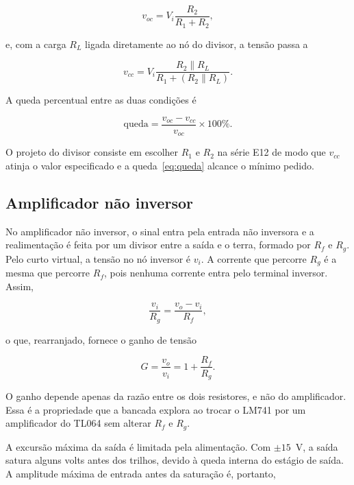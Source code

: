 \documentclass[11pt,a4paper]{article}
\begin{document}
\begin{equation}
v_{oc} = V_i \frac{R_2}{R_1 + R_2} ,
\label{eq:divisor_vazio}
\end{equation}

e, com a carga $R_L$ ligada diretamente ao nó do divisor, a tensão passa a

\begin{equation}
v_{cc} = V_i \frac{R_2 \parallel R_L}{R_1 + (R_2 \parallel R_L)} .
\label{eq:divisor_carga}
\end{equation}

A queda percentual entre as duas condições é

\begin{equation}
\text{queda} = \frac{v_{oc} - v_{cc}}{v_{oc}} \times 100\% .
\label{eq:queda}
\end{equation}

O projeto do divisor consiste em escolher $R_1$ e $R_2$ na série E12 de modo que $v_{cc}$ atinja o valor especificado e a queda~\eqref{eq:queda} alcance o mínimo pedido.

\subsection{Amplificador não inversor}

No amplificador não inversor, o sinal entra pela entrada não inversora e a realimentação é feita por um divisor entre a saída e o terra, formado por $R_f$ e $R_g$. Pelo curto virtual, a tensão no nó inversor é $v_i$. A corrente que percorre $R_g$ é a mesma que percorre $R_f$, pois nenhuma corrente entra pelo terminal inversor. Assim,

\begin{equation}
\frac{v_i}{R_g} = \frac{v_o - v_i}{R_f} ,
\label{eq:nao_inv_corrente}
\end{equation}

o que, rearranjado, fornece o ganho de tensão

\begin{equation}
G = \frac{v_o}{v_i} = 1 + \frac{R_f}{R_g} .
\label{eq:nao_inv_ganho}
\end{equation}

O ganho depende apenas da razão entre os dois resistores, e não do amplificador. Essa é a propriedade que a bancada explora ao trocar o LM741 por um amplificador do TL064 sem alterar $R_f$ e $R_g$.

A excursão máxima da saída é limitada pela alimentação. Com $\pm 15$~V, a saída satura alguns volts antes dos trilhos, devido à queda interna do estágio de saída. A amplitude máxima de entrada antes da saturação é, portanto,
\end{document}
